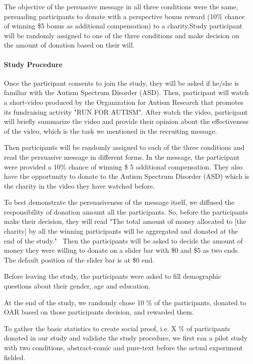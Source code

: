 The objective of the persuasive message in all three conditions were the same, persuading participants to donate with a perspective bonus reward (10\% chance of winning \$5 bonus as additional compensation) to a charity.Study participant will be randomly assigned to one of the three conditions and make decision on the amount of donation based on their will.

\paragraph{Study Procedure} Once the participant consents to join the study, they will be asked if he/she is familiar with the Autism Spectrum Disorder (ASD). Then, participant will watch a short-video produced by the Organization for Autism Research that promotes its fundraising activity "RUN FOR AUTISM". After watch the video, participant will briefly summarize the video and provide their opinion about the effectiveness of the video, which is the task we mentioned in the recruiting message.

Then participants will be randomly assigned to each of the three conditions and read the persuasive message in different forms. In the message, the participant were provided a 10\% chance of winning \$ 5 additional compensation. They also have the opportunity to donate to the Autism Spectrum Disorder (ASD) which is the charity in the video they have watched before.

To best demonstrate the persuasiveness of the message itself, we diffused the responsibility of donation amount all the participants. So, before the participants make their decision, they will read "The total amount of money allocated to [the charity] by all the winning participants will be aggregated and donated at the end of the study."~\cite{lee2013does} Then the participants will be asked to decide the amount of money they were willing to donate on a slider bar with \$0 and \$5 as two ends. The default position of the slider bar is at \$0 end.

Before leaving the study, the participants were asked to fill demographic questions about their gender, age and education.

At the end of the study, we randomly chose 10 \% of the participants, donated to OAR based on those participants decision, and rewarded them.

To gather the basic statistics to create social proof, i.e.  X \% of participants donated in our study and validate the study procedure, we first ran a pilot study with two conditions, abstract-comic and pure-text before the actual experiment fielded.


